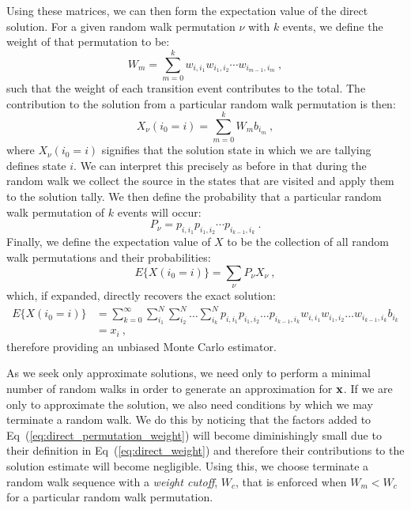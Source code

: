 Using these matrices, we can then form the expectation value of the
direct solution. For a given random walk permutation $\nu$ with $k$
events, we define the weight of that permutation to be:
\begin{equation}
  W_{m} = \sum_{m=0}^k w_{i,i_1} w_{i_1,i_2} \cdots w_{i_{m-1},i_m}\:,
  \label{eq:direct_permutation_weight}
\end{equation}
such that the weight of each transition event contributes to the
total. The contribution to the solution from a particular random walk
permutation is then:
\begin{equation}
  X_{\nu}(i_0 = i) = \sum_{m=0}^k W_{m} b_{i_m}\:,
  \label{eq:direct_permutation_contribution}
\end{equation}
where $X_{\nu}(i_0 = i)$ signifies that the solution state in which we
are tallying defines state $i$.  We can interpret this precisely as
before in that during the random walk we collect the source in the
states that are visited and apply them to the solution tally. We then
define the probability that a particular random walk permutation of
$k$ events will occur:
\begin{equation}
  P_{\nu} = p_{i,i_1} p_{i_1,i_2} \cdots p_{i_{k-1},i_k}\:.
  \label{eq:direct_permutation_probability}
\end{equation}
Finally, we define the expectation value of $X$ to be the collection
of all random walk permutations and their probabilities:
\begin{equation}
  E\{X(i_0 = i)\} = \sum_{\nu} P_{\nu} X_{\nu}\:,
  \label{eq:direct_expectation_value}
\end{equation}
which, if expanded, directly recovers the exact solution:
\begin{equation}
  \begin{split}
    E\{X(i_0 = i)\}
    &=\sum_{k=0}^{\infty}\sum_{i_1}^{N}\sum_{i_2}^{N}\ldots
    \sum_{i_k}^{N} p_{i,i_1}p_{i_1,i_2}\ldots p_{i_{k-1},i_k}
    w_{i,i_1}w_{i_1,i_2}\ldots w_{i_{k-1},i_k} b_{i_k}\\ &= x_i\:,
  \end{split}
  \label{eq:direct_expectation_expansion}
\end{equation}
therefore providing an unbiased Monte Carlo estimator. 

As we seek only approximate solutions, we need only to perform a
minimal number of random walks in order to generate an approximation
for $\mathbf{x}$. If we are only to approximate the solution, we also need
conditions by which we may terminate a random walk. We do this by
noticing that the factors added to
Eq~(\ref{eq:direct_permutation_weight}) will become diminishingly
small due to their definition in Eq~(\ref{eq:direct_weight}) and
therefore their contributions to the solution estimate will become
negligible. Using this, we choose terminate a random walk sequence with
a \textit{weight cutoff}, $W_c$, that is enforced when $W_m < W_c$ for
a particular random walk permutation.

